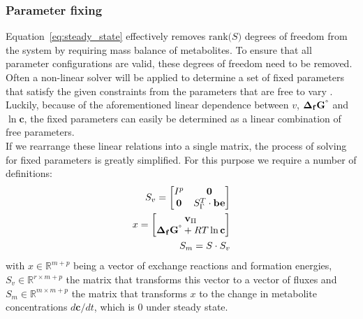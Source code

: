 \documentclass[10pt,letterpaper]{article}
\newcommand{\sdgf}{\Delta_fG^{\degree}}
\newcommand{\bsdgf}{\mathbf{\sdgf}}
\newcommand{\bc}{\mathbf{c}}
\newcommand{\bv}{\mathbf{v}}
\newcommand{\bbe}{\mathbf{be}}
\begin{document}
\subsubsection{Parameter fixing}
Equation~\ref{eq:steady_state} effectively removes $\text{rank(}S\text{)}$ degrees of freedom from the system by requiring mass balance of metabolites.
To ensure that all parameter configurations are valid, these degrees of freedom need to be removed.
Often a non-linear solver will be applied to determine a set of fixed parameters that satisfy the given constraints from the parameters that are free to vary \cite{stan_docs_solver}.
Luckily, because of the aforementioned linear dependence between $v$, $\bsdgf$ and $\ln{\bc}$, the fixed parameters can easily be determined as a linear combination of free parameters.
\\
If we rearrange these linear relations into a single matrix, the process of solving for fixed parameters is greatly simplified.
For this purpose we require a number of definitions:
\begin{align}
    S_v = \begin{bmatrix}
             I^p & \mathbf{0} \\
             \mathbf{0} & S_{\Gamma}^T \cdot \bbe\\
          \end{bmatrix} \\
    x = \begin{bmatrix}
            \bv_{\Pi} \\
            \bsdgf + RT\ln{\bc}\\
        \end{bmatrix} \\
    S_m = S \cdot S_v\\
\end{align}
with $x \in \mathbb{R}^{m+p}$ being a vector of exchange reactions and formation energies, $S_v \in \mathbb{R}^{r \times m+p}$
 the matrix that transforms this vector to a vector of fluxes and $S_m \in \mathbb{R}^{m \times m+p}$ the matrix that
 transforms $x$ to the change in metabolite concentrations $d\bc/dt$, which is 0 under steady state.
\end{document}
